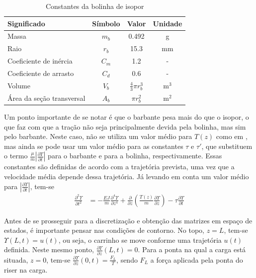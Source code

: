 \begin{table}[!ht]
	\centering
	\begin{tabular}{|l|c|c|c|}
		\hline
		\textbf{Significado} & \textbf{Símbolo} & \textbf{Valor} & \textbf{Unidade}\\ \hline \hline
		Massa & $m_{b}$ & 0.492 & g\\ \hline
		Raio & $r_{b}$ & 15.3 & mm\\ \hline
		Coeficiente de inércia & $C_m$ & 1.2 & - \\ \hline
		Coeficiente de arrasto & $C_d$ & 0.6 & - \\ \hline
		Volume & $V_b$ & $\frac{4}{3}\pi r_b^3$ & $\textrm{m}^3$ \\ \hline
		Área da seção transversal & $A_b$ & $\pi r_b^2$ & m$^2$\\ \hline
	\end{tabular}
	\caption{Constantes da bolinha de isopor\label{constanteIsopor}}
\end{table}


 Um ponto importante de se notar é que o barbante pesa mais do que o isopor, o que faz com que a tração não seja principalmente devida pela bolinha, mas sim pelo barbante. Neste caso, não se utiliza um valor médio para $T(z)$ como em \cite{fabricioIFAC}, mas ainda se pode usar um valor médio para as constantes $\tau$ e $\tau'$, que substituem o termo $\frac{\mu}{m}\left|\frac{\partial \Upsilon}{\partial t}\right|$ para o barbante e para a bolinha, respectivamente. Essas constantes são definidas de acordo com a trajetória prevista, uma vez que a velocidade média depende dessa trajetória. Já levando em conta um valor médio para $\left|\frac{\partial \Upsilon}{\partial t}\right|$, tem-se \begin{align}
	\frac{\partial^2 \Upsilon}{\partial t^2} &= -\frac{EJ}{m}\frac{\partial^4 \Upsilon}{\partial z^4} + \frac{\partial}{\partial z}\left(\frac{T(z)}{m}\frac{\partial \Upsilon}{\partial z}\right) - \tau\frac{\partial \Upsilon}{\partial t}\label{EquacaoComTau}
	\end{align}

 Antes de se prosseguir para a discretização e obtenção das matrizes em espaço de estados, é importante pensar nas condições de contorno. No topo, $z=L$, tem-se $\Upsilon(L,t)=u(t)$, ou seja, o carrinho se move conforme uma trajetória $u(t)$ definida. Neste mesmo ponto, $\frac{\partial\Upsilon}{\partial z}(L,t) = 0$. Para a ponta na qual a carga está situada, $z=0$, tem-se $\frac{\partial\Upsilon}{\partial z}(0,t) = \frac{F_L}{T}$, sendo $F_L$ a força aplicada pela ponta do riser na carga.

